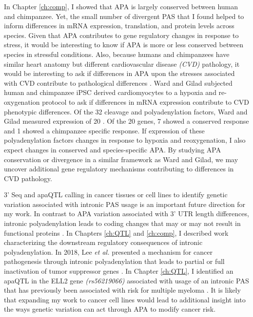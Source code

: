 In Chapter \ref{ch:comp}, I showed that APA is largely conserved between human and chimpanzee. Yet, the small number of divergent PAS that I found helped to inform differences in mRNA expression, translation, and protein levels across species. Given that APA contributes to gene regulatory changes in response to stress, it would be interesting to know if APA is more or less conserved between species in stressful conditions. Also, because humans and chimpanzees have similar heart anatomy but different cardiovascular disease \emph{(CVD)} pathology, it would be interesting to ask if differences in APA upon the stresses associated with CVD contribute to pathological differences \citep{lammey_interstitial_2008, varki_original_2009}. Ward and Gilad subjected human and chimpanzee iPSC derived cardiomyocytes to a hypoxia and re-oxygenation protocol to ask if differences in mRNA expression contribute to CVD phenotypic differences. Of the 32 cleavage and polyadenylation factors, Ward and Gilad measured expression of 20 \citep{sadek_alternative_2019, ward_generally_2019}. Of the 20 genes, 7 showed a conserved response and 1 showed a chimpanzee specific response. If expression of these polyadenylation factors changes in response to hypoxia and reoxygenation, I also expect changes in conserved and species-specific APA. By studying APA conservation or divergence in a similar framework as Ward and Gilad, we may uncover additional gene regulatory mechanisms contributing to differences in CVD pathology. 


3' Seq and apaQTL calling in cancer tissues or cell lines to identify genetic variation associated with intronic PAS usage is an important future direction for my work. In contrast to APA variation associated with 3' UTR length differences, intronic polyadenylation leads to coding changes that may or may not result in functional proteins \citep{tian_alternative_2017, vasudevan_non-stop_2002, yao_coding_2012}. In Chapters \ref{ch:QTL} and \ref{ch:comp}, I described work characterizing the downstream regulatory consequences of intronic polyadenylation. In 2018, Lee \emph{et al.} presented a mechanism for cancer pathogenesis through intronic polyadenylation that leads to partial or full inactivation of tumor suppressor genes \citep{lee_widespread_2018}. In Chapter \ref{ch:QTL}, I identified an apaQTL in the ELL2 gene \emph{(rs56219066)} associated with usage of an intronic PAS that has previously been associated with risk for multiple myeloma \citep{swaminathan_variants_2015}. It is likely that expanding my work to cancer cell lines would lead to additional insight into the ways genetic variation can act through APA to modify cancer risk.

